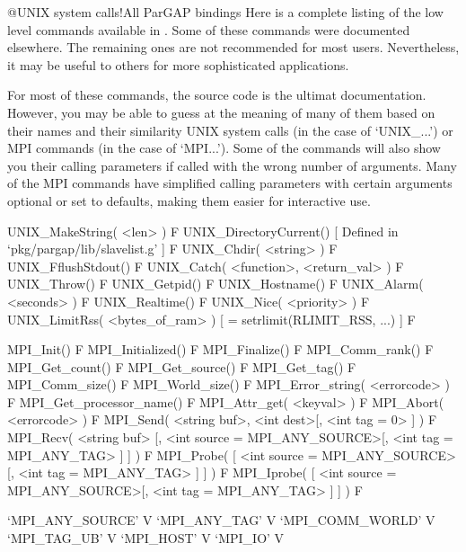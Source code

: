 %
{@UNIX system calls!All ParGAP bindings}
Here is a complete  listing  of  the  low  level  commands  available  in
{\ParGAP}.  Some  of  these  commands  were  documented  elsewhere.   The
remaining ones are not recommended for most users. Nevertheless,  it  may
be useful to others for more sophisticated applications.

For most of these commands, the source code is the ultimat documentation.
However, you may be able to guess at the meaning of many of them based on
their names and their similarity  UNIX  system  calls  (in  the  case  of
`UNIX_...') or MPI commands (in  the  case  of  `MPI...').  Some  of  the
commands will also show you their calling parameters if called  with  the
wrong number of arguments. Many  of  the  MPI  commands  have  simplified
calling parameters with certain arguments optional or  set  to  defaults,
making them easier for interactive use.

\>UNIX_MakeString( <len> ) F
\>UNIX_DirectoryCurrent() [ Defined in `pkg/pargap/lib/slavelist.g' ] F
\>UNIX_Chdir( <string> ) F
\>UNIX_FflushStdout() F
\>UNIX_Catch( <function>, <return_val> ) F
\>UNIX_Throw() F
\>UNIX_Getpid() F
\>UNIX_Hostname() F
\>UNIX_Alarm( <seconds> ) F
\>UNIX_Realtime() F
\>UNIX_Nice( <priority> ) F
\>UNIX_LimitRss( <bytes_of_ram> ) [ = setrlimit(RLIMIT_RSS, ...) ] F

\>MPI_Init() F
\>MPI_Initialized() F
\>MPI_Finalize() F
\>MPI_Comm_rank() F
\>MPI_Get_count() F
\>MPI_Get_source() F
\>MPI_Get_tag() F
\>MPI_Comm_size() F
\>MPI_World_size() F
\>MPI_Error_string( <errorcode> ) F
\>MPI_Get_processor_name() F
\>MPI_Attr_get( <keyval> ) F
\>MPI_Abort( <errorcode> ) F
\>MPI_Send( <string buf>, <int dest>[, <int tag = 0> ] ) F
\>MPI_Recv( <string buf> [, <int source = MPI_ANY_SOURCE>[, <int tag = MPI_ANY_TAG> ] ] ) F
\>MPI_Probe( [ <int source = MPI_ANY_SOURCE>[, <int tag = MPI_ANY_TAG> ] ] ) F
\>MPI_Iprobe( [ <int source = MPI_ANY_SOURCE>[, <int tag = MPI_ANY_TAG> ] ] ) F

\>`MPI_ANY_SOURCE' V
\>`MPI_ANY_TAG' V
\>`MPI_COMM_WORLD' V
\>`MPI_TAG_UB' V
\>`MPI_HOST' V
\>`MPI_IO' V

